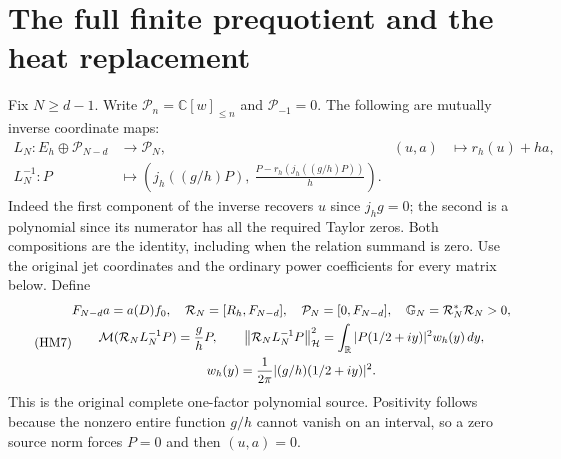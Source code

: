 \documentclass[11pt]{article}
\newcommand{\C}{\mathbb C}\newcommand{\R}{\mathbb R}
\newcommand{\PP}{\mathcal P}\newcommand{\Hh}{\mathcal H}
\newcommand{\norm}[1]{\left\lVert#1\right\rVert}
\begin{document}
\section{The full finite prequotient and the heat replacement}
Fix $N\ge d-1$. Write $\PP_n=\C[w]_{\le n}$ and $\PP_{-1}=0$.
The following are mutually inverse coordinate maps:
\begin{equation}\tag{HM6}
 \begin{aligned}
 L_N:E_h\oplus\PP_{N-d}&\longrightarrow\PP_N,
      &(u,a)&\longmapsto r_h(u)+ha,\\
 L_N^{-1}:P&\longmapsto
 \left(j_h((g/h)P),\ \frac{P-r_h(j_h((g/h)P))}{h}\right).
 \end{aligned}
\end{equation}
Indeed the first component of the inverse recovers $u$ since $j_h g=0$;
the second is a polynomial since its numerator has all the required
Taylor zeros. Both compositions are the identity, including when the
relation summand is zero. Use the original jet coordinates and the
ordinary power coefficients for every matrix below. Define
\begin{equation}\tag{HM7}
 \begin{gathered}
 F_{N-d}a=a(D)f_0,\quad
 \mathcal R_N=[R_h,F_{N-d}],\quad
 \mathcal P_N=[0,F_{N-d}],\quad
 \mathbb G_N=\mathcal R_N^*\mathcal R_N>0,\\
 \M(\mathcal R_NL_N^{-1}P)=\frac{g}{h}P,\qquad
 \norm{\mathcal R_NL_N^{-1}P}_{\Hh}^2
 =\int_\R |P(1/2+iy)|^2 w_h(y)\,dy,\\
 w_h(y)=\frac1{2\pi}|(g/h)(1/2+iy)|^2.
 \end{gathered}
\end{equation}
This is the original complete one-factor polynomial source. Positivity
follows because the nonzero entire function $g/h$ cannot vanish on an
interval, so a zero source norm forces $P=0$ and then $(u,a)=0$.
\end{document}
